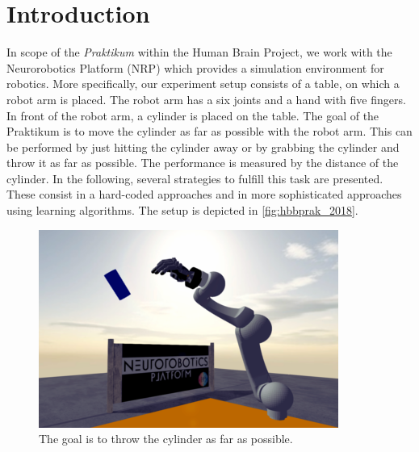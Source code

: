 \section{Introduction}
In scope of the \textit{Praktikum} within the Human Brain Project, we work with the Neurorobotics Platform (NRP) which provides a simulation environment for robotics.
More specifically, our experiment setup consists of a table, on which a robot arm is placed.
The robot arm has a six joints and a hand with five fingers.
In front of the robot arm, a cylinder is placed on the table.
The goal of the Praktikum is to move the cylinder as far as possible with the robot arm.
This can be performed by just hitting the cylinder away or by grabbing the cylinder and throw it as far as possible.
The performance is measured by the distance of the cylinder.
In the following, several strategies to fulfill this task are presented.
These consist in a hard-coded approaches and in more sophisticated approaches using learning algorithms.
The setup is depicted in \autoref{fig:hbbprak_2018}.

\begin{figure}[h]
\centering
\includegraphics[width=.95\columnwidth]{figures/hbpprak_2018.png}
\caption{The goal is to throw the cylinder as far as possible.}
\label{fig:hbbprak_2018}
\end{figure}